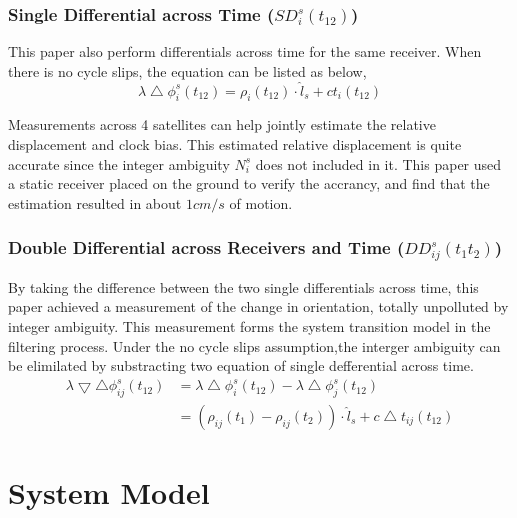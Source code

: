 \documentclass[journal,onecolumn]{IEEEtran}
\begin{document}
\subsubsection{Single Differential across Time ($SD_{i}^{s}(t_{12})$)}
This paper also perform differentials across time for the same receiver. When there is no cycle slips, the equation can be listed as below,
\begin{equation}
  \lambda \bigtriangleup \phi_{i}^s(t_{12}) = \rho_i(t_{12}) \cdot \hat{l}_s + ct_i(t_{12})
\end{equation}

Measurements across 4 satellites can help jointly estimate the relative displacement and clock bias. This
estimated relative displacement is quite accurate since the integer ambiguity $N_i^s$ does not included in it. This paper used
a static receiver placed on the ground to verify the accrancy, and find that the estimation resulted in about $1 cm/s$ of motion.

\subsubsection{Double Differential across Receivers and Time ($DD_{ij}^s(t_1t_2)$)}
By taking the difference between the two single differentials across time,
this paper achieved a measurement of the change in orientation, totally unpolluted by integer ambiguity.
This measurement forms the system transition model in the filtering process. Under the no cycle slips assumption,the interger ambiguity can be elimilated by substracting two equation of single defferential across time.
\begin{equation}
  \begin{split}
  \lambda \bigtriangledown \bigtriangleup \phi_{ij}^{s}(t_{12})
  &= \lambda \bigtriangleup \phi_{i}^s(t_{12}) - \lambda \bigtriangleup \phi_{j}^s(t_{12})\\
  &= (\rho_{ij}(t_1)-\rho_{ij}(t_2)) \cdot \hat{l}_s + c\bigtriangleup t_{ij}(t_{12})
  \end{split}
\end{equation}

\section{System Model}
\end{document}
